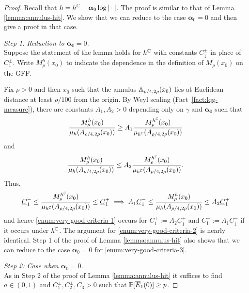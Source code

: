 \documentclass[12pt]{amsart}
\numberwithin{equation}{section}
\newcommand{\Mrho}[2]{\hyperref[eq:alternate-size]{M_{#1}(#2)}}
\begin{document}
	\begin{proof}
		Recall that $h = h^\C -\boldsymbol{\alpha}_0 \log |\cdot|$. The proof is similar to that of Lemma \ref{lemma:annulus-hit}. We show that 
		we can reduce to the case $\boldsymbol{\alpha}_0 = 0$ and then give a proof in that case. 
		
		{\it Step 1: Reduction to $\boldsymbol{\alpha}_0 = 0$.} \\
		Suppose the statement of the lemma holds for $h^{\C}$ with constants $\underline{C}^{\pm}_1$ in place of $C^{\pm}_1$.  Write $M^{h}_{\rho}(x_0)$ to indicate the dependence in the definition of $\Mrho{\rho}{x_0}$
		on the GFF. 
		
		
		Fix $\rho > 0$ and then $x_0$ such that the annulus $\A_{\rho/4, 2\rho}(x_0)$ lies at Euclidean distance at least $\rho/100$ from the origin. 
		By Weyl scaling (Fact~\ref{fact:lqg-measure}), there are constants $A_1,A_2>  0$ depending only on $\gamma$ and $\boldsymbol{\alpha}_0$ such that 
		\begin{equation}
		\frac{M^{h}_{\rho}(x_0)}{\mu_h(A_{\rho/4, 2 \rho}(x_0))} \geq A_1  \frac{M^{h^\C}_{\rho}(x_0)}{\mu_{h^\C}(A_{\rho/4, 2 \rho}(x_0))}
		\end{equation}
		and
		\begin{equation}
		\frac{M^{h}_{\rho}(x_0)}{\mu_h(A_{\rho/4, 2 \rho}(x_0))} \leq A_2  \frac{M^{h^\C}_{\rho}(x_0)}{\mu_{h^\C}(A_{\rho/4, 2 \rho}(x_0))}.
		\end{equation} 
		Thus, 
		\[
		\underline{C}^{-}_1 \leq  \frac{M^{h^\C}_{\rho}(x_0)}{\mu_{h^\C}(A_{\rho/4, 2 \rho}(x_0))} \leq \underline{C}^{+}_1 \implies A_1 \underline{C}^{-}_1 \leq \frac{M^{h}_{\rho}(x_0)}{\mu_h(A_{\rho/4, 2 \rho}(x_0))} \leq A_2 \underline{C}^{+}_1 
		\]	
		and hence \ref{enum:very-good-criteria-1} occurs for $C^+_1 := A_2 \underline{C}^{+}_1$ and $C^-_1 := A_1 \underline{C}^{-}_1$ if it occurs under $h^{\C}$.
		The argument for \ref{enum:very-good-criteria-2} is nearly identical. Step 1 of the proof of Lemma \ref{lemma:annulus-hit} also shows that we can 
		reduce to the case $\boldsymbol{\alpha}_0 = 0$ for \ref{enum:very-good-criteria-3}.
		
		
		
		
		
		
		
		{\it Step 2: Case when $\boldsymbol{\alpha}_0 = 0$.} \\
		As in Step 2 of the proof of Lemma \ref{lemma:annulus-hit} it suffices to find $a \in (0,1)$
		and  $C^{\pm}_1, C^{\pm}_2, C_3 > 0$ such that $\P[\overline E_1(0)] \geq p$.
		

\end{proof}
\end{document}
